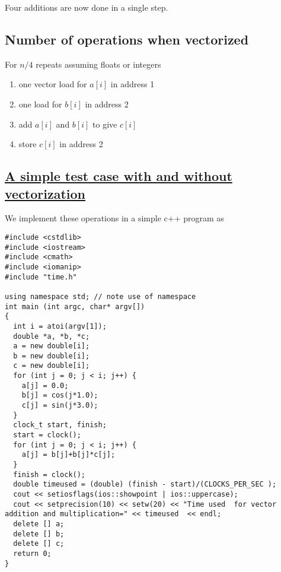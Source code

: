 \documentclass[%
oneside,                 %
final,                   %
10pt]{article}
\begin{document}
\noindent
Four additions are now done in a single step.

\subsection*{Number of operations when vectorized}
For $n/4$ repeats assuming floats or integers
\begin{enumerate}
\item one vector load for $a[i]$ in address 1

\item one load for $b[i]$ in address 2

\item add $a[i]$ and $b[i]$ to give $c[i]$

\item store $c[i]$ in address 2
\end{enumerate}

\noindent
\subsection*{\href{{https://github.com/CompPhysics/ComputationalPhysicsMSU/blob/master/doc/Programs/LecturePrograms/programs/Classes/cpp/program7.cpp}}{A simple test case with and without vectorization}}
We implement these operations in a simple c++ program as 

\begin{Verbatim}[numbers=none,fontsize=\fontsize{9pt}{9pt},baselinestretch=0.95]
#include <cstdlib>
#include <iostream>
#include <cmath>
#include <iomanip>
#include "time.h" 

using namespace std; // note use of namespace                                       
int main (int argc, char* argv[])
{
  int i = atoi(argv[1]); 
  double *a, *b, *c;
  a = new double[i]; 
  b = new double[i]; 
  c = new double[i]; 
  for (int j = 0; j < i; j++) {
    a[j] = 0.0;
    b[j] = cos(j*1.0);
    c[j] = sin(j*3.0);
  }
  clock_t start, finish;
  start = clock();
  for (int j = 0; j < i; j++) {
    a[j] = b[j]+b[j]*c[j];
  }
  finish = clock();
  double timeused = (double) (finish - start)/(CLOCKS_PER_SEC );
  cout << setiosflags(ios::showpoint | ios::uppercase);
  cout << setprecision(10) << setw(20) << "Time used  for vector addition and multiplication=" << timeused  << endl;
  delete [] a;
  delete [] b;
  delete [] c;
  return 0;     
}
\end{Verbatim}


\end{document}
